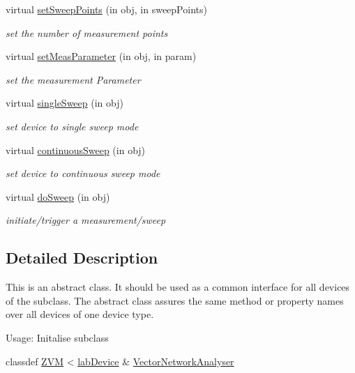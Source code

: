 \begin{DoxyCompactItemize}
virtual \hyperlink{class_vector_network_analyser_aabccea00e92ce77920553db971f07c49}{set\+Sweep\+Points} (in obj, in sweep\+Points)
\begin{DoxyCompactList}\small\item\em set the number of measurement points \end{DoxyCompactList}\item 
virtual \hyperlink{class_vector_network_analyser_a8e207eafb459a9306868a178da4dc32c}{set\+Meas\+Parameter} (in obj, in param)
\begin{DoxyCompactList}\small\item\em set the measurement Parameter \end{DoxyCompactList}\item 
virtual \hyperlink{class_vector_network_analyser_a60937f9c3680fa17968fd966009194e9}{single\+Sweep} (in obj)
\begin{DoxyCompactList}\small\item\em set device to single sweep mode \end{DoxyCompactList}\item 
virtual \hyperlink{class_vector_network_analyser_a3897caf03faa79af3ba39787117a5ed1}{continuous\+Sweep} (in obj)
\begin{DoxyCompactList}\small\item\em set device to continuous sweep mode \end{DoxyCompactList}\item 
virtual \hyperlink{class_vector_network_analyser_a6ba2aa6383fe5add61b042c41d0e14db}{do\+Sweep} (in obj)
\begin{DoxyCompactList}\small\item\em initiate/trigger a measurement/sweep \end{DoxyCompactList}\end{DoxyCompactItemize}


\subsection{Detailed Description}
This is an abstract class. It should be used as a common interface for all devices of the subclass. The abstract class assures the same method or property names over all devices of one device type. 

Usage\+: Initalise subclass 
\begin{DoxyCode}
classdef  \hyperlink{class_z_v_m}{ZVM} < \hyperlink{classlab_device}{labDevice} & \hyperlink{class_vector_network_analyser}{VectorNetworkAnalyser}
\end{DoxyCode}
 

